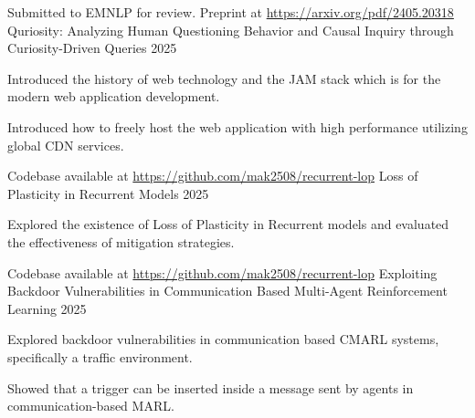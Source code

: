 

\begin{cventries}

  \cventry
    {Submitted to EMNLP for review. Preprint at \url{https://arxiv.org/pdf/2405.20318}} %
    {Quriosity: Analyzing Human Questioning Behavior
and Causal Inquiry through Curiosity-Driven Queries} %
    {} %
    {2025} %
    {
      \begin{cvitems} %
        \item {Introduced the history of web technology and the JAM stack which is for the modern web application development.}
        \item {Introduced how to freely host the web application with high performance utilizing global CDN services.}
      \end{cvitems}
    }

  \cventry
    {Codebase available at \url{https://github.com/mak2508/recurrent-lop}} %
    {Loss of Plasticity in Recurrent Models} %
    {} %
    {2025} %
    {
      \begin{cvitems} %
        \item {Explored the existence of Loss of Plasticity in Recurrent models and evaluated the effectiveness of mitigation strategies.}
      \end{cvitems}
    }

\cventry
{Codebase available at \url{https://github.com/mak2508/recurrent-lop}} %
{Exploiting Backdoor Vulnerabilities in Communication Based Multi-Agent Reinforcement Learning} %
{} %
{2025} %
{
  \begin{cvitems} %
    \item {Explored backdoor vulnerabilities in communication based CMARL systems, specifically a traffic environment.}
    \item {Showed that a trigger can be inserted inside a message sent by agents in communication-based MARL.}
  \end{cvitems}
}


\end{cventries}
